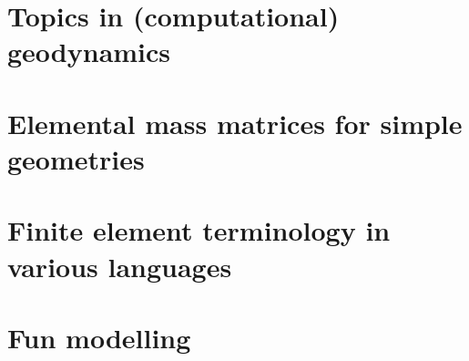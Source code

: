 \documentclass[a4paper]{article}
\begin{document}
\section{Topics in (computational) geodynamics} \label{app:topics} %
\newpage %
\section{Elemental mass matrices for simple geometries}\label{app:mm} 
\newpage %
\section{Finite element terminology in various languages}  %
\newpage %
\section{Fun modelling}  %
\newpage %





\newpage %
\printindex %
\newpage %
\listoftodos[Notes] %
\end{document}

